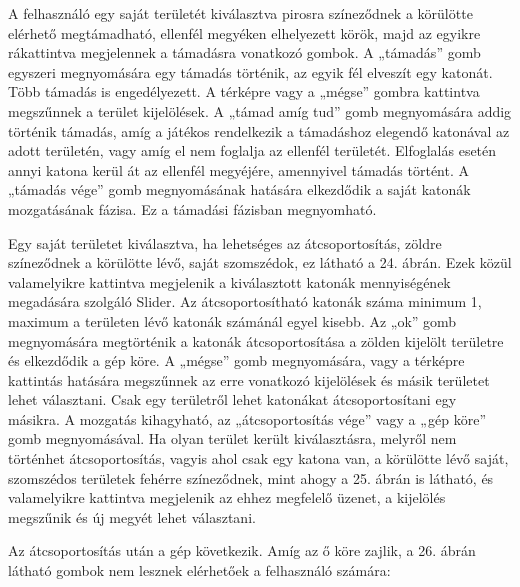 

A felhasználó egy saját területét kiválasztva pirosra színeződnek a körülötte elérhető megtámadható, ellenfél megyéken elhelyezett körök, majd az egyikre rákattintva megjelennek a támadásra vonatkozó gombok. A „támadás” gomb egyszeri megnyomására egy támadás történik, az egyik fél elveszít egy katonát. Több támadás is engedélyezett. A térképre vagy a „mégse” gombra kattintva megszűnnek a terület kijelölések. A „támad amíg tud” gomb megnyomására addig történik támadás, amíg a játékos rendelkezik a támadáshoz elegendő katonával az adott területén, vagy amíg el nem foglalja az ellenfél területét. Elfoglalás esetén annyi katona kerül át az ellenfél megyéjére, amennyivel támadás történt. A „támadás vége” gomb megnyomásának hatására elkezdődik a saját katonák mozgatásának fázisa. Ez a támadási fázisban megnyomható. 





Egy saját területet kiválasztva, ha lehetséges az átcsoportosítás, zöldre színeződnek a körülötte lévő, saját szomszédok, ez látható a 24. ábrán. Ezek közül valamelyikre kattintva megjelenik a kiválasztott katonák mennyiségének megadására szolgáló Slider. Az átcsoportosítható katonák száma minimum 1, maximum a területen lévő katonák számánál egyel kisebb. Az „ok” gomb megnyomására megtörténik a katonák átcsoportosítása a zölden kijelölt területre és elkezdődik a gép köre. A „mégse” gomb megnyomására, vagy a térképre kattintás hatására megszűnnek az erre vonatkozó kijelölések és másik területet lehet választani. Csak egy területről lehet katonákat átcsoportosítani egy másikra. A mozgatás kihagyható, az „átcsoportosítás vége” vagy a „gép köre” gomb megnyomásával. Ha olyan terület került kiválasztásra, melyről nem történhet átcsoportosítás, vagyis ahol csak egy katona van, a körülötte lévő saját, szomszédos területek fehérre színeződnek, mint ahogy a 25. ábrán is látható, és valamelyikre kattintva megjelenik az ehhez megfelelő üzenet, a kijelölés megszűnik és új megyét lehet választani.  

 


Az átcsoportosítás után a gép következik. Amíg az ő köre zajlik, a 26. ábrán látható gombok nem lesznek elérhetőek a felhasználó számára: 



